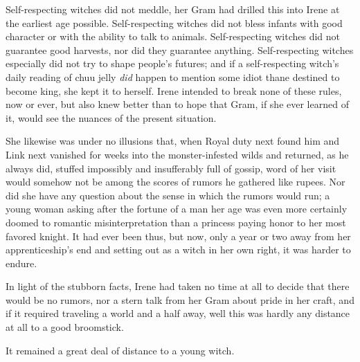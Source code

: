 \documentclass[../FGP.tex]{subfiles}
\begin{document}
Self-respecting witches did not meddle, her Gram had drilled this into Irene at the earliest age possible. Self-respect\-ing witches did not bless infants with good character or with the ability to talk to animals. Self-respecting witches did not guarantee good harvests, nor did they guarantee anything. Self-respecting witches especially did not try to shape people's futures; and if a self-respecting witch's daily reading of chuu jelly \emph{did} happen to mention some idiot thane destined to become king, she kept it to herself.
Irene intended to break none of these rules, now or ever, but also knew better than to hope that Gram, if she ever learned of it, would see the nuances of the present situation.

She likewise was under no illusions that, when Royal duty next found him and Link next vanished for weeks into the monster-infested wilds and returned, as he always did, stuffed impossibly and insufferably full of gossip, word of her visit would somehow not be among the scores of rumors he gathered like rupees. Nor did she have any question about the sense in which the rumors would run; a young woman asking after the fortune of a man her age was even more certainly doomed to romantic misinterpretation than a princess paying honor to her most favored knight. It had ever been thus, but now, only a year or two away from her apprenticeship's end and setting out as a witch in her own right, it was harder to endure.

In light of the stubborn facts, Irene had taken no time at all to decide that there would be no rumors, nor a stern talk from her Gram about pride in her craft, and if it required traveling a world and a half away, well this was hardly any distance at all to a good broomstick.

It remained a great deal of distance to a young witch.  


\end{document}
